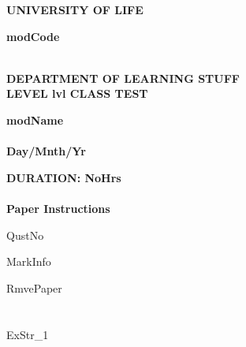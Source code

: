 \documentclass[a4paper, leqno, 12pt]{article} %
\newenvironment{top_enumerate}{
\begin{enumerate}
  \setlength{\itemsep}{2em}
  \setlength{\topsep}{-0pt}
  \setlength{\partopsep}{-0pt}
}{\end{enumerate}}
\begin{document}
\chead{}            %
\singlespacing

\begin{center}
\textbf{\large{     %
UNIVERSITY OF LIFE
}}
\end{center}

\begin{flushright}
\textbf{\large{modCode}}
\end{flushright}
\vspace{-1cm}

\doublespacing
\begin{center}
\textbf{\large{   %
\\
DEPARTMENT OF LEARNING STUFF
\\
LEVEL lvl CLASS TEST}}
\end{center}

\begin{center}
\textbf{\large{
modName
\\
\quad
\\
Day/Mnth/Yr}}

\textbf{\large{DURATION:} NoHrs
\\
\quad
\\
Paper Instructions}
\end{center}

\singlespacing
\noindent
QustNo

\medskip
\noindent
MarkInfo

\medskip
\noindent
RmvePaper


\newpage
\chead{\thepage}            %
\rfoot{}                %



\section*{}

\begin{top_enumerate}

ExStr_1

\end{top_enumerate}
\end{document}
